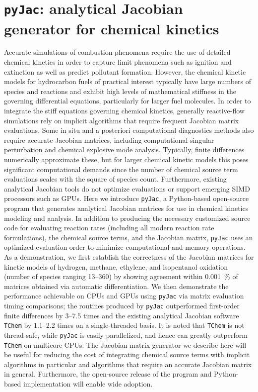 \documentclass[a4paper,10pt]{article}
\begin{document}
\section{\texttt{pyJac}: analytical Jacobian generator for chemical kinetics}
Accurate simulations of combustion phenomena require the use of detailed chemical kinetics in order to capture limit phenomena such as ignition and extinction as well as predict pollutant formation.
However, the chemical kinetic models for hydrocarbon fuels of practical interest typically have large numbers of species and reactions and exhibit high levels of mathematical stiffness in the governing differential equations, particularly for larger fuel molecules.
In order to integrate the stiff equations governing chemical kinetics, generally reactive-flow simulations rely on implicit algorithms that require frequent Jacobian matrix evaluations.
Some in situ and a posteriori computational diagnostics methods also require accurate Jacobian matrices, including computational singular perturbation and chemical explosive mode analysis.
Typically, finite differences numerically approximate these, but for larger chemical kinetic models this poses significant computational demands since the number of chemical source term evaluations scales with the square of species count.
Furthermore, existing analytical Jacobian tools do not optimize evaluations or support emerging SIMD processors such as GPUs.
Here we introduce \texttt{pyJac}, a Python-based open-source program that generates analytical Jacobian matrices for use in chemical kinetics modeling and analysis.
In addition to producing the necessary customized source code for evaluating reaction rates (including all modern reaction rate formulations), the chemical source terms, and the Jacobian matrix, \texttt{pyJac} uses an optimized evaluation order to minimize computational and memory operations.
As a demonstration, we first establish the correctness of the Jacobian matrices for kinetic models of hydrogen, methane, ethylene, and isopentanol oxidation (number of species ranging \numrange{13}{360}) by showing agreement within \SI{0.001}{\percent} of matrices obtained via automatic differentiation.
We then demonstrate the performance achievable on CPUs and GPUs using \texttt{pyJac} via matrix evaluation timing comparisons; the routines produced by \texttt{pyJac} outperformed first-order finite differences by \numrange{3}{7.5} times and the existing analytical Jacobian software \texttt{TChem} by \numrange{1.1}{2.2} times on a single-threaded basis.
It is noted that \texttt{TChem} is not thread-safe, while \texttt{pyJac} is easily parallelized, and hence can greatly outperform \texttt{TChem} on multicore CPUs.
The Jacobian matrix generator we describe here will be useful for reducing the cost of integrating chemical source terms with implicit algorithms in particular and algorithms that require an accurate Jacobian matrix in general.
Furthermore, the open-source release of the program and Python-based implementation will enable wide adoption.
\end{document}
